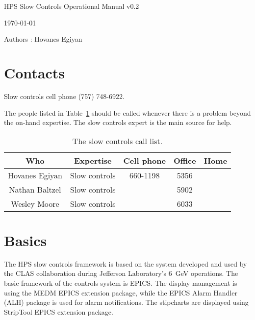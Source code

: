 \documentclass[letter,10pt]{article}
\begin{document}
\begin{center}
\Large HPS Slow Controls Operational Manual v0.2

\today

\normalsize Authors : Hovanes Egiyan\\

\end{center}

\section{Contacts}
Slow controls cell phone  (757) 748-6922. \newline 

The people listed in Table~\ref{tab:controls_contact} should be called whenever there is a problem beyond the on-hand
expertise. The slow controls expert is the main source for help.
\begin{table}[h]
\begin{center}
\begin{tabular}{|c|c|c|c|c|}   \hline
	  Who 			& Expertise		&  Cell phone	&   Office  	&		Home    \\  \hline
\hline
         Hovanes Egiyan		& Slow controls		& 660-1198	&  5356		& 			\\  \hline
         Nathan Baltzel		& Slow controls		&		&  5902		& 			\\  \hline 
         Wesley Moore		& Slow controls		&		&  6033		& 			\\  \hline          
\end{tabular}
\end{center}
\caption{The slow controls call list.}
\label{tab:controls_contact}
\end{table}


\section{Basics}
The HPS slow controls framework is based on the system developed and used by the CLAS collaboration during Jefferson Laboratory's 6~GeV 
operations. The basic framework of the controls system is EPICS. The display management is using the MEDM EPICS extension package, 
while the EPICS Alarm Handler (ALH) package is used for alarm notifications. The stipcharts are displayed using StripTool EPICS extension package. 
\end{document}
